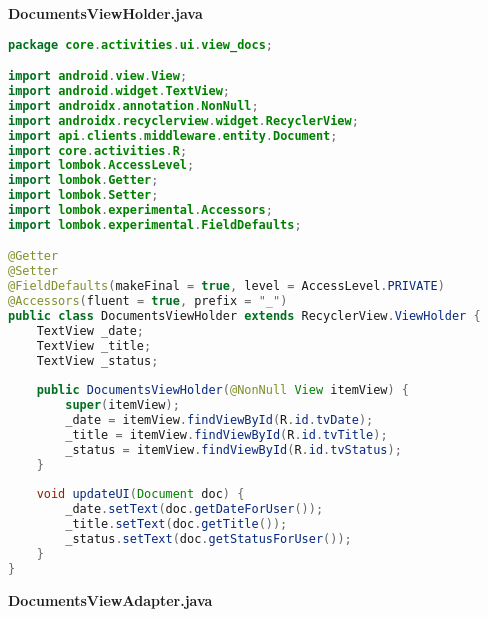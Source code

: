 \begin{lstlisting}[language=Java]
\end{lstlisting}
\textbf{DocumentsViewHolder.java}
\begin{lstlisting}[language=Java]
package core.activities.ui.view_docs;

import android.view.View;
import android.widget.TextView;
import androidx.annotation.NonNull;
import androidx.recyclerview.widget.RecyclerView;
import api.clients.middleware.entity.Document;
import core.activities.R;
import lombok.AccessLevel;
import lombok.Getter;
import lombok.Setter;
import lombok.experimental.Accessors;
import lombok.experimental.FieldDefaults;

@Getter
@Setter
@FieldDefaults(makeFinal = true, level = AccessLevel.PRIVATE)
@Accessors(fluent = true, prefix = "_")
public class DocumentsViewHolder extends RecyclerView.ViewHolder {
	TextView _date;
	TextView _title;
	TextView _status;
	
	public DocumentsViewHolder(@NonNull View itemView) {
		super(itemView);
		_date = itemView.findViewById(R.id.tvDate);
		_title = itemView.findViewById(R.id.tvTitle);
		_status = itemView.findViewById(R.id.tvStatus);
	}
	
	void updateUI(Document doc) {
		_date.setText(doc.getDateForUser());
		_title.setText(doc.getTitle());
		_status.setText(doc.getStatusForUser());
	}
}

\end{lstlisting}
\textbf{DocumentsViewAdapter.java}
